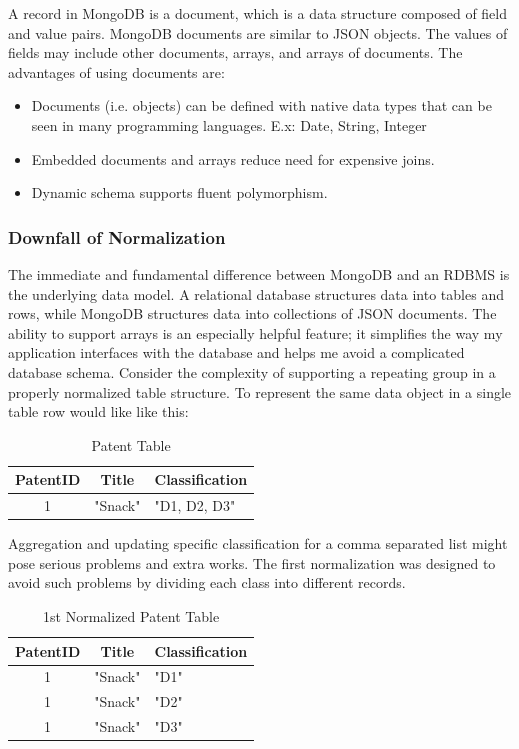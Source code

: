 \documentclass{sig-alternate}
\begin{document}
{A record in MongoDB is a document, which is a data structure composed of field and value pairs. MongoDB documents are similar to JSON objects. The values of fields may include other documents, arrays, and arrays of documents. The advantages of using documents are:
\begin{itemize}
\item Documents (i.e. objects) can be defined with native data types that can be seen in many programming languages. E.x: Date, String, Integer
\item Embedded documents and arrays reduce need for expensive joins.
\item Dynamic schema supports fluent polymorphism.
\end{itemize}

\subsubsection{Downfall of Normalization }
The immediate and fundamental difference between MongoDB and an RDBMS is the underlying data model. A relational database structures data into tables and rows, while MongoDB structures data into collections of JSON documents. The ability to support arrays is an especially helpful feature; it simplifies the way my application interfaces with the database and helps me avoid a complicated database schema. Consider the complexity of supporting a repeating group in a properly normalized table structure. To represent the same data object in a single table row would like like this:
\begin{table}[htb]
\begin{tabular}{|c|c|l|} \hline
PatentID&Title&Classification\\ \hline
1& "Snack"& "D1, D2, D3"\\ \hline
\end{tabular}
\centering
\caption{Patent Table}
\end{table}
Aggregation and updating specific classification for a comma separated list might pose serious problems and extra works. The first normalization was designed to avoid such problems by dividing each class into different records.

\begin{table}[htb]
\begin{tabular}{|c|c|l|} \hline
PatentID&Title&Classification\\ \hline
1& "Snack"& "D1"\\ \hline
1& "Snack"& "D2"\\ \hline
1& "Snack"& "D3"\\ \hline
\end{tabular}
\centering
\caption{1st Normalized Patent Table}
\end{table}

}
\end{document}
